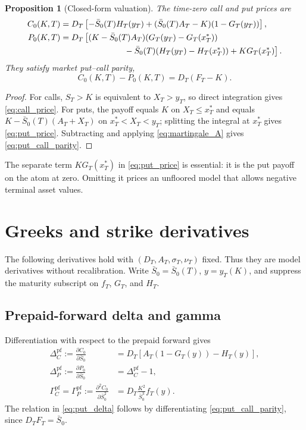 \documentclass[11pt,a4paper]{article}
\newtheorem{proposition}{Proposition}[section]
\newcommand{\cdf}{G}
\begin{document}
\begin{proposition}[Closed-form valuation]
The time-zero call and put prices are
\begin{align}
  C_0(K,T)
  &=D_T\left[
      -\bar S_0(T)H_T(y_T)
      +(\bar S_0(T)A_T-K)(1-\cdf_T(y_T))
    \right],
  \label{eq:call_price}\\
  P_0(K,T)
  &=D_T\left[
      (K-\bar S_0(T)A_T)
      (\cdf_T(y_T)-\cdf_T(x_T^*))
    \right.
  \notag\\
  &\hspace{2.6cm}\left.
      {}-\bar S_0(T)(H_T(y_T)-H_T(x_T^*))
      +K\cdf_T(x_T^*)
    \right].
  \label{eq:put_price}
\end{align}
They satisfy market put--call parity,
\begin{equation}
  C_0(K,T)-P_0(K,T)=D_T(F_T-K).
  \label{eq:put_call_parity}
\end{equation}
\end{proposition}

\begin{proof}
For calls, $S_T>K$ is equivalent to $X_T>y_T$, so direct integration gives
\eqref{eq:call_price}.  For puts, the payoff equals $K$ on
$X_T\le x_T^*$ and equals
$K-\bar S_0(T)(A_T+X_T)$ on $x_T^*<X_T<y_T$; splitting the integral at
$x_T^*$ gives \eqref{eq:put_price}.  Subtracting and applying
\eqref{eq:martingale_A} gives \eqref{eq:put_call_parity}.
\end{proof}

The separate term $K\cdf_T(x_T^*)$ in \eqref{eq:put_price} is essential: it is
the put payoff on the atom at zero.  Omitting it prices an unfloored model that
allows negative terminal asset values.

\section{Greeks and strike derivatives}

The following derivatives hold with $(D_T,A_T,\sigma_T,\nu_T)$ fixed.  Thus
they are model derivatives without recalibration.  Write
$\bar S_0=\bar S_0(T)$, $y=y_T(K)$, and suppress the maturity subscript on
$f_T$, $\cdf_T$, and $H_T$.

\subsection{Prepaid-forward delta and gamma}

Differentiation with respect to the prepaid forward gives
\begin{align}
  \Delta_C^{\mathrm{pf}}
  :=\frac{\partial C_0}{\partial \bar S_0}
  &=D_T\left[A_T(1-\cdf_T(y))-H_T(y)\right],
  \label{eq:call_delta}\\
  \Delta_P^{\mathrm{pf}}
  :=\frac{\partial P_0}{\partial \bar S_0}
  &=\Delta_C^{\mathrm{pf}}-1,
  \label{eq:put_delta}\\
  \Gamma_C^{\mathrm{pf}}
  =\Gamma_P^{\mathrm{pf}}
  :=\frac{\partial^2 C_0}{\partial \bar S_0^2}
  &=D_T\frac{K^2}{\bar S_0^3}f_T(y).
  \label{eq:gamma}
\end{align}
The relation in \eqref{eq:put_delta} follows by differentiating
\eqref{eq:put_call_parity}, since $D_TF_T=\bar S_0$.
\end{document}
